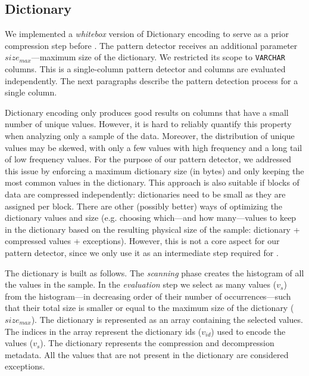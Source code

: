 \subsection{Dictionary}
\label{subsec:pd:dict}



\graphicspath{{5_automatic_learning/pattern_detection/images/}}

% 

We implemented a \textit{whitebox} version of Dictionary encoding to serve as a prior compression step before . The pattern detector receives an additional parameter \(size_{max}\)---maximum size of the dictionary. We restricted its scope to \verb|VARCHAR| columns. This is a single-column pattern detector and columns are evaluated independently. The next paragraphs describe the pattern detection process for a single column.

Dictionary encoding only produces good results on columns that have a small number of unique values. However, it is hard to reliably quantify this property when analyzing only a sample of the data. Moreover, the distribution of unique values may be skewed, with only a few values with high frequency and a long tail of low frequency values. For the purpose of our pattern detector, we addressed this issue by enforcing a maximum dictionary size (in bytes) and only keeping the most common values in the dictionary. This approach is also suitable if blocks of data are compressed independently: dictionaries need to be small as they are assigned per block. There are other (possibly better) ways of optimizing the dictionary values and size (e.g. choosing which---and how many---values to keep in the dictionary based on the resulting physical size of the sample: dictionary + compressed values + exceptions). However, this is not a core aspect for our pattern detector, since we only use it as an intermediate step required for .

The dictionary is built as follows. The \textit{scanning} phase creates the histogram of all the values in the sample. In the \textit{evaluation} step we select as many values (\(v_{s}\)) from the histogram---in decreasing order of their number of occurrences---such that their total size is smaller or equal to the maximum size of the dictionary (\(size_{max}\)). The dictionary is represented as an array containing the selected values. The indices in the array represent the dictionary ids (\(v_{id}\)) used to encode the values (\(v_{s}\)). The dictionary represents the compression and decompression metadata. All the values that are not present in the dictionary are considered exceptions.

